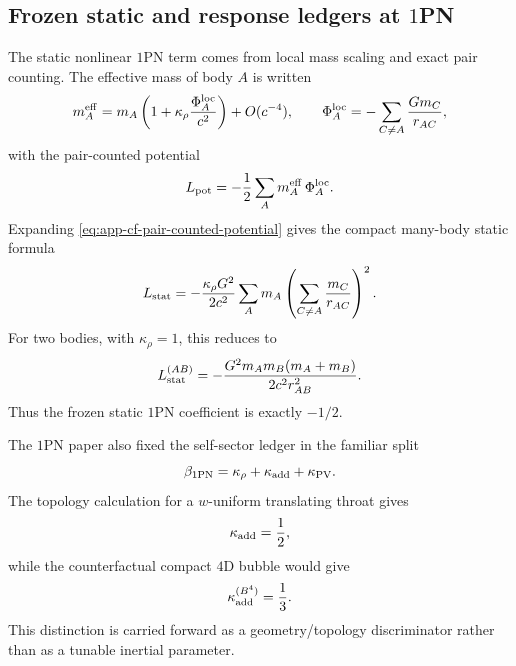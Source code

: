 \documentclass[11pt]{article}
\newcommand{\OnePN}{\mathrm{1PN}}
\begin{document}
\subsection{Frozen static and response ledgers at \texorpdfstring{$1$}{1}PN}
\label{app:carry-forward-static-response}

The static nonlinear \(\OnePN\) term comes from local mass scaling and exact pair
counting.  The effective mass of body \(A\) is written
\begin{equation}
m_A^{\rm eff}
=
m_A\left(1+\kappa_\rho\frac{\Phi_A^{\rm loc}}{c^2}\right)+O(c^{-4}),
\qquad
\Phi_A^{\rm loc}
=
-\sum_{C\neq A}\frac{Gm_C}{r_{AC}},
\label{eq:app-cf-local-mass-scaling}
\end{equation}
with the pair-counted potential
\begin{equation}
L_{\rm pot}
=
-\frac12\sum_A m_A^{\rm eff}\,\Phi_A^{\rm loc}.
\label{eq:app-cf-pair-counted-potential}
\end{equation}
Expanding \cref{eq:app-cf-pair-counted-potential} gives the compact many-body static
formula
\begin{equation}
L_{\rm stat}
=
-\frac{\kappa_\rho G^2}{2c^2}
\sum_A m_A\left(\sum_{C\neq A}\frac{m_C}{r_{AC}}\right)^2.
\label{eq:app-cf-static-many-body}
\end{equation}
For two bodies, with \(\kappa_\rho=1\), this reduces to
\begin{equation}
L_{\rm stat}^{(AB)}
=
-\frac{G^2m_A m_B(m_A+m_B)}{2c^2r_{AB}^2}.
\label{eq:app-cf-static-two-body}
\end{equation}
Thus the frozen static \(\OnePN\) coefficient is exactly \(-1/2\).

The \(\OnePN\) paper also fixed the self-sector ledger in the familiar split
\begin{equation}
\beta_{\OnePN}=\kappa_\rho+\kappa_{\rm add}+\kappa_{\rm PV}.
\label{eq:app-cf-beta-ledger}
\end{equation}
The topology calculation for a \(w\)-uniform translating throat gives
\begin{equation}
\kappa_{\rm add}=\frac12,
\label{eq:app-cf-kappa-add}
\end{equation}
while the counterfactual compact \(4\)D bubble would give
\begin{equation}
\kappa_{\rm add}^{(B^4)}=\frac13.
\label{eq:app-cf-kappa-add-bubble}
\end{equation}
This distinction is carried forward as a geometry/topology discriminator rather than as a
tunable inertial parameter.
\end{document}
